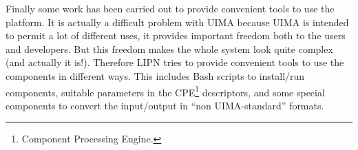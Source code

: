 Finally some work has been carried out to provide convenient tools to use the platform. It is actually a difficult problem with UIMA because UIMA is intended to permit a lot of different uses, it provides important freedom both to the users and developers. But this freedom makes the whole system look quite complex (and actually it is!). Therefore LIPN tries to provide convenient tools to use the components in different ways. This includes Bash scripts to install/run components, suitable parameters in the CPE\footnote{Component Processing Engine.} descriptors, and some special components to convert the input/output in ``non UIMA-standard'' formats.







